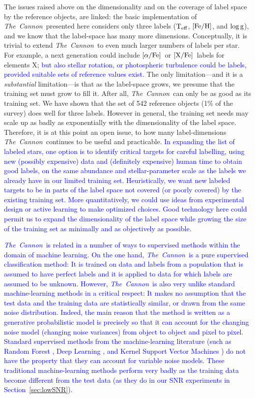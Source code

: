 \documentclass[12pt, preprint]{aastex}
\newcommand{\tc}{\textsl{The~Cannon}}
\newcommand{\teff}{\mbox{$\rm T_{eff}$}}
\newcommand{\feh}{\mbox{$\rm [Fe/H]$}}
\newcommand{\xfe}{\mbox{$\rm [X/Fe]$}}
\newcommand{\alphafe}{\mbox{$\rm [\alpha/Fe]$}}
\newcommand{\logg}{\mbox{$\rm \log g$}}
\begin{document}
The issues raised above on the dimensionality and on the coverage of label space by the reference objects, are linked: 
the basic implementation of \tc\ presented here considers only three
labels (\teff, \feh, and \logg), and we know that the label-space has many more dimensions.
Conceptually, it is trivial to extend \tc\ to even much larger numbers of labels per star. 
For example, a next generation could include \alphafe\ or \xfe\
labels for elements X; \textcolor{blue}{but also stellar rotation, or photospheric turbulence could be labels, provided suitable sets of reference values exist.}
The only limitation---and it is a \emph{substantial} limitation---is
that as the label-space grows, we presume that the training set must grow to fill it.
After all, \tc\ can only be as good as its training set.
We have shown that the set of 542 reference objects (1$\%$ of the survey) does well for three labels. However in general, the training set needs may scale up as badly as exponentially with the dimensionality of the label space. Therefore, it is at this point an open issue, to 
how many label-dimensions \tc\ continues to be useful and practicable. \textcolor{blue}{In expanding the list of labeled stars, one option is to identify critical targets for careful labelling, using new (possibly expensive) data and (definitely expensive) human time to obtain good labels, on the same abundance and stellar-parameter scale as the labels we already have in our limited training set.  Heuristically, we want new labeled targets to be in parts of the label space not covered (or poorly covered) by the existing training set.  More quantitatively, we could use ideas from experimental design or active learning \citep{active} to make optimized choices.  Good technology here could permit us to expand the dimensionality of the label space while growing the size of the training set as minimally and as objectively as possible.}

\textcolor{blue}{\tc\ is related in a number of ways to supervised methods within the domain of machine learning. On the one hand, \tc\ is a pure supervised classification method:  It is trained on data and labels from a population that is assumed to have perfect labels and it is applied to data for which labels are assumed to be unknown.  However, \tc\ is also very unlike standard machine-learning methods in a critical respect:  It makes no assumption that the test data and the training data are statistically similar, or drawn from the same noise distribution.  Indeed, the main reason that the method is written as a generative probabilistic model is precisely so that it can account for the changing noise model (changing noise variances) from object to object and pixel to pixel.  Standard supervised methods from the machine-learning literature (such as Random Forest \citep{RF}, Deep Learning \citep[e.g.,][]{DL2,DL3,DL}, and Kernel Support Vector Machines \citep{SVM}) do not have the property that they can account for variable noise models. These traditional machine-learning methods perform very badly as the training data become different from the test data (as they do in our SNR experiments in Section~\ref{sec:lowSNR}).}
\end{document}
